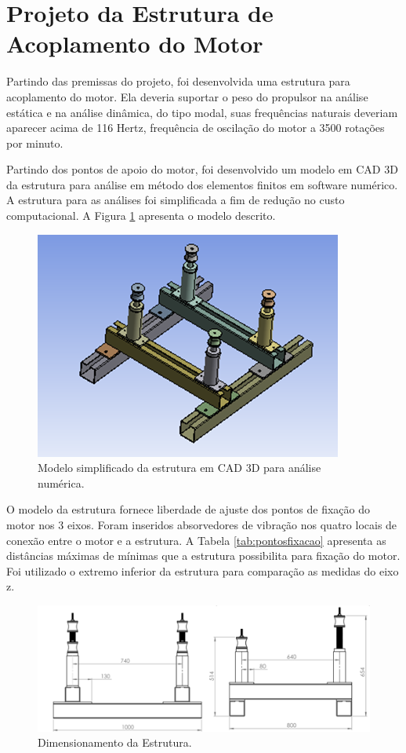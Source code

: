 \section{Projeto da Estrutura de Acoplamento do Motor}

Partindo das premissas do projeto, foi desenvolvida uma estrutura para acoplamento do motor. Ela deveria suportar o peso do propulsor na análise estática e na análise dinâmica, do tipo modal, suas frequências naturais deveriam aparecer acima de 116 Hertz, frequência de oscilação do motor a 3500 rotações por minuto.

Partindo dos pontos de apoio do motor, foi desenvolvido um modelo em CAD 3D da estrutura para análise em método dos elementos finitos em software numérico. A estrutura para as análises foi simplificada a fim de redução no custo computacional. A Figura \ref{fig:estrutura3D} apresenta o modelo descrito.

\begin{figure}[h!]
	\centering
	\includegraphics[keepaspectratio=true,scale= 0.8]{figuras/estrutura-3D.png}
	\caption{Modelo simplificado da estrutura em CAD 3D para análise numérica.}
	\label{fig:estrutura3D}
\end{figure}

O modelo da estrutura fornece liberdade de ajuste dos pontos de fixação do motor nos 3 eixos. Foram inseridos absorvedores de vibração nos quatro locais de conexão entre o motor e a estrutura. A Tabela \ref{tab:pontosfixacao} apresenta as distâncias máximas de mínimas que a estrutura possibilita para fixação do motor. Foi utilizado o extremo inferior da estrutura para comparação as medidas do eixo z.

\begin{figure}[h!]
	\centering
	\includegraphics[keepaspectratio=true,scale= 0.8]{figuras/dimensionamento.png}
	\caption{Dimensionamento da Estrutura.}
	\label{fig:dimensionamento}
\end{figure}


